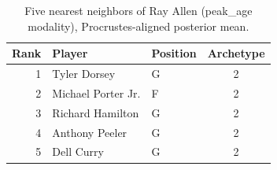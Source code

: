 \begin{table}[htbp]
  \centering\small
  \begin{tabular}{rllc}
    \toprule
    Rank & Player & Position & Archetype \\
    \midrule
    1 & Tyler Dorsey & G & 2 \\
    2 & Michael Porter Jr. & F & 2 \\
    3 & Richard Hamilton & G & 2 \\
    4 & Anthony Peeler & G & 2 \\
    5 & Dell Curry & G & 2 \\
    \bottomrule
  \end{tabular}
  \caption{Five nearest neighbors of Ray Allen (peak_age modality), Procrustes-aligned posterior mean.}
  \label{tab:Ray_Allen_neighbors_peak_age}
\end{table}

